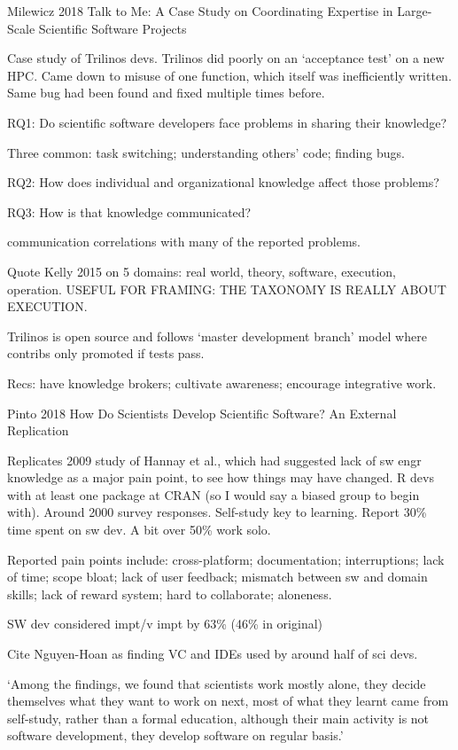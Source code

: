 \documentclass[12pt]{amsart}
\begin{document}
Milewicz 2018 Talk to Me: A Case Study on Coordinating Expertise in Large-Scale Scientific Software Projects

Case study of Trilinos devs. Trilinos did poorly on an `acceptance test' on a new HPC. Came down to misuse of one function, which itself was inefficiently written. Same bug had been found and fixed multiple times before. 

RQ1: Do scientific software developers face problems in sharing their knowledge?

Three common: task switching; understanding others' code; finding bugs.

RQ2: How does individual and organizational knowledge affect those problems?

RQ3: How is that knowledge communicated?

communication correlations with many of the reported problems.

Quote Kelly 2015 on 5 domains: real world, theory, software, execution, operation. USEFUL FOR FRAMING: THE TAXONOMY IS REALLY ABOUT EXECUTION.

Trilinos is open source and follows `master development branch' model where contribs only promoted if tests pass.

Recs: have knowledge brokers; cultivate awareness; encourage integrative work.



Pinto 2018 How Do Scientists Develop Scientific Software? An External Replication

Replicates 2009 study of Hannay et al., which had suggested lack of sw engr knowledge as a major pain point, to see how things may have changed. R devs with at least one package at CRAN (so I would say a biased group to begin with).  Around 2000 survey responses. Self-study key to learning. Report 30\% time spent on sw dev. A bit over 50\% work solo. 

Reported pain points include: cross-platform; documentation; interruptions; lack of time; scope bloat; lack of user feedback; mismatch between sw and domain skills; lack of reward system; hard to collaborate; aloneness.

SW dev considered impt/v impt by 63\% (46\% in original)

Cite Nguyen-Hoan as finding VC and IDEs used by around half of sci devs.

`Among the findings, we found that scientists work mostly alone, they decide themselves what they want to work on next, most of what they learnt came from self-study, rather than a formal education, although their main activity is not software development, they develop software on regular basis.'
\end{document}
